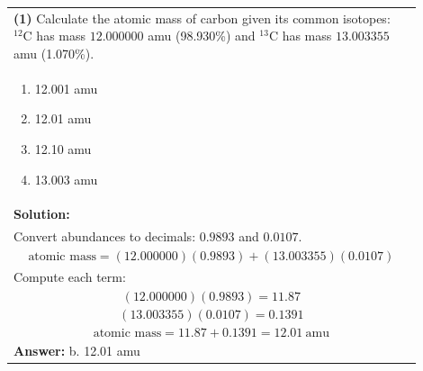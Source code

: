 \documentclass{article}
\begin{document}
{\begin{tabular}{|p{0.9\linewidth}|}
\hline
\vspace{0.2cm}
\textbf{(1)} Calculate the atomic mass of carbon given its common isotopes: $^{12}\text{C}$ has mass $12.000000$ amu (98.930\%) and $^{13}\text{C}$ has mass $13.003355$ amu (1.070\%). \\
\begin{minipage}[t]{0.85\linewidth}
\begin{enumerate}[label=\alph*.]
\item 12.001 amu \
\item 12.01 amu \
\item 12.10 amu \
\item 13.003 amu
\end{enumerate}
\end{minipage}\\
\hline
\vspace{0.2cm}
\textbf{Solution:} \\
Convert abundances to decimals: $0.9893$ and $0.0107$. \\

\[
\text{atomic mass} = (12.000000)(0.9893)+(13.003355)(0.0107)
\] \\
Compute each term: \\
\[
(12.000000)(0.9893)=11.87
\] \\
\[
(13.003355)(0.0107)=0.1391
\] \\
\[
\text{atomic mass}=11.87+0.1391=12.01~\text{amu}
\] \\ 
\hline
\vspace{0.2cm}
\textbf{Answer:} b. 12.01 amu\\
\hline
\end{tabular}

}
\end{document}
